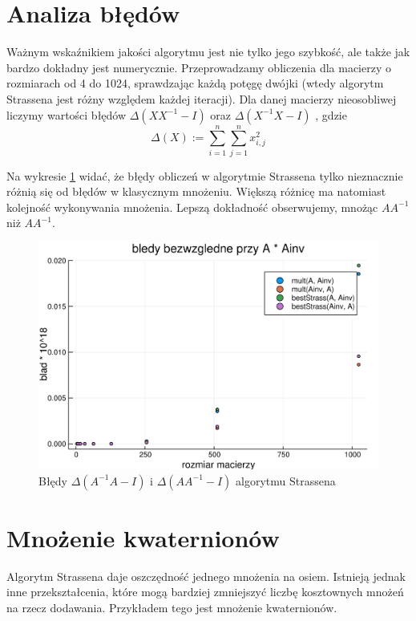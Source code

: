 \documentclass[paper=a4, fontsize=11pt]{scrartcl} %
\numberwithin{equation}{section} %
\numberwithin{figure}{section} %
\numberwithin{table}{section} %
\begin{document}
\section{Analiza błędów}
Ważnym wskaźnikiem jakości algorytmu jest nie tylko jego szybkość, ale także jak bardzo dokładny jest numerycznie.
Przeprowadzamy obliczenia dla macierzy o rozmiarach od 4 do 1024, 
sprawdzając każdą potęgę dwójki (wtedy algorytm Strassena jest różny względem każdej iteracji). Dla danej macierzy nieosobliwej liczymy wartości błędów 
$\Delta(X X^{-1} - I)$ oraz $\Delta(X^{-1}X - I)$ , gdzie 
$${\Delta(X) := \sum_{i=1}^n \sum_{j=1}^n x_{i,j}^2 }$$ \medbreak

Na wykresie \ref{blad} widać, że błędy obliczeń w algorytmie Strassena tylko nieznacznie różnią się od błędów w klasycznym mnożeniu.
Większą różnicę ma natomiast kolejność wykonywania mnożenia.
Lepszą dokładność obserwujemy, mnożąc ${A A^{-1} }$ niż ${A A^{-1} }$. 

\begin{figure}[h!]
  \includegraphics[width=\linewidth]{inv.jpg}
  \caption{Błędy $\Delta(A^{-1}A - I)$ i $\Delta(A A^{-1} - I)$ algorytmu Strassena}
  \label{blad}
\end{figure}

\FloatBarrier

\section{Mnożenie kwaternionów}
Algorytm Strassena daje oszczędność jednego mnożenia na osiem. Istnieją jednak inne przekształcenia,
które mogą bardziej zmniejszyć liczbę kosztownych mnożeń na rzecz dodawania. Przykładem tego jest mnożenie kwaternionów.
\end{document}
